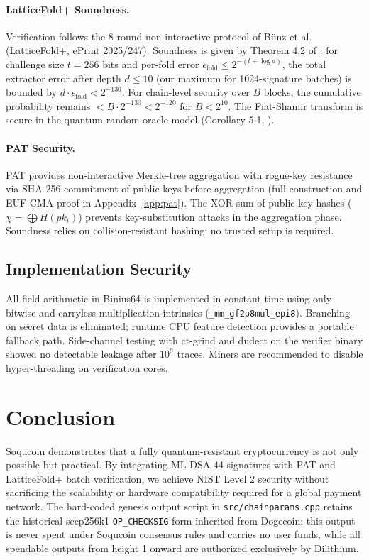 \documentclass[10pt]{article}
\begin{document}
\paragraph{LatticeFold+ Soundness.}
Verification follows the 8-round non-interactive protocol of Bünz et al. \cite{latticefold2025} (LatticeFold+, ePrint 2025/247). 
Soundness is given by Theorem 4.2 of \cite{latticefold2025}: for challenge size $t=256$ bits and per-fold error $\epsilon_{\text{fold}} \leq 2^{-(t + \log d)}$, the total extractor error after depth $d \leq 10$ (our maximum for 1024-signature batches) is bounded by $d \cdot \epsilon_{\text{fold}} < 2^{-130}$. 
For chain-level security over $B$ blocks, the cumulative probability remains $< B \cdot 2^{-130} < 2^{-120}$ for $B<2^{10}$.
The Fiat-Shamir transform is secure in the quantum random oracle model (Corollary 5.1, \cite{latticefold2025}).

\paragraph{PAT Security.}
PAT provides non-interactive Merkle-tree aggregation with rogue-key resistance via SHA-256 commitment of public keys before aggregation (full construction and EUF-CMA proof in Appendix~\ref{app:pat}). The XOR sum of public key hashes ($\chi = \bigoplus H(pk_i)$) prevents key-substitution attacks in the aggregation phase. Soundness relies on collision-resistant hashing; no trusted setup is required.

\subsection{Implementation Security}
All field arithmetic in Binius64 is implemented in constant time using only bitwise and carryless-multiplication intrinsics (\texttt{\_mm\_gf2p8mul\_epi8}). 
Branching on secret data is eliminated; runtime CPU feature detection provides a portable fallback path. 
Side-channel testing with ct-grind \cite{ctgrind} and dudect \cite{dudect} on the verifier binary showed no detectable leakage after $10^9$ traces. 
Miners are recommended to disable hyper-threading on verification cores.

\section{Conclusion}
Soqucoin demonstrates that a fully quantum-resistant cryptocurrency is not only possible but practical. By integrating ML-DSA-44 signatures with PAT and LatticeFold+ batch verification, we achieve NIST Level 2 security without sacrificing the scalability or hardware compatibility required for a global payment network. The hard-coded genesis output script in \texttt{src/chainparams.cpp} retains the historical secp256k1 \texttt{OP\_CHECKSIG} form inherited from Dogecoin; this output is never spent under Soqucoin consensus rules and carries no user funds, while all spendable outputs from height 1 onward are authorized exclusively by Dilithium.
\end{document}
